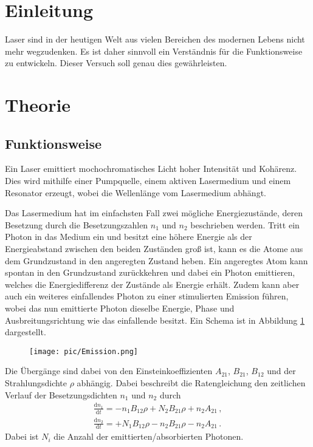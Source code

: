 \section{Einleitung} %
\label{sec:einleitung}

Laser sind in der heutigen Welt aus vielen Bereichen des modernen Lebens nicht mehr wegzudenken.
Es ist daher sinnvoll ein Verständnis für die Funktionsweise zu entwickeln.
Dieser Versuch soll genau dies gewährleisten.

\section{Theorie} %
\label{sec:theorie}

\subsection{Funktionsweise} %
\label{sub:was_ist_ein_laser_}

Ein Laser emittiert mochochromatisches Licht hoher Intensität und Kohärenz.
Dies wird mithilfe einer Pumpquelle, einem aktiven Lasermedium und einem Resonator erzeugt, wobei die Wellenlänge vom Lasermedium abhängt.

Das Lasermedium hat im einfachsten Fall zwei mögliche Energiezustände, deren Besetzung durch die Besetzungszahlen $n_1$ und $n_2$ beschrieben werden.
Tritt ein Photon in das Medium ein und besitzt eine höhere Energie als der Energieabstand zwischen den beiden Zuständen groß ist, kann es die Atome aus dem Grundzustand in den angeregten Zustand heben.
Ein angeregtes Atom kann spontan in den Grundzustand zurückkehren und dabei ein Photon emittieren, welches die Energiedifferenz der Zustände als Energie erhält.
Zudem kann aber auch ein weiteres einfallendes Photon zu einer stimulierten Emission führen, wobei das nun emittierte Photon dieselbe Energie, Phase und Ausbreitungsrichtung wie das einfallende besitzt.
Ein Schema ist in Abbildung \ref{Emission} dargestellt.

\begin{figure}[h!]
	\texttt{[image: pic/Emission.png]}
	\label{Emission}
\end{figure}

Die Übergänge sind dabei von den Einsteinkoeffizienten $A_{21}$, $B_{21}$, $B_{12}$ und der Strahlungsdichte $\rho$ abhängig.
Dabei beschreibt die Ratengleichung den zeitlichen Verlauf der Besetzungsdichten $n_1$ und $n_2$ durch
\begin{align*}
	\frac{\mathrm{d}n_1}{\mathrm{d}t} = -n_1 B_{12} \rho + N_2 B_{21} \rho + n_2 A_{21}\,,\\
	\frac{\mathrm{d}n_2}{\mathrm{d}t} = +N_1 B_{12} \rho - n_2 B_{21} \rho - n_2 A_{21}\,.
\end{align*}
Dabei ist $N_i$ die Anzahl der emittierten/absorbierten Photonen.

